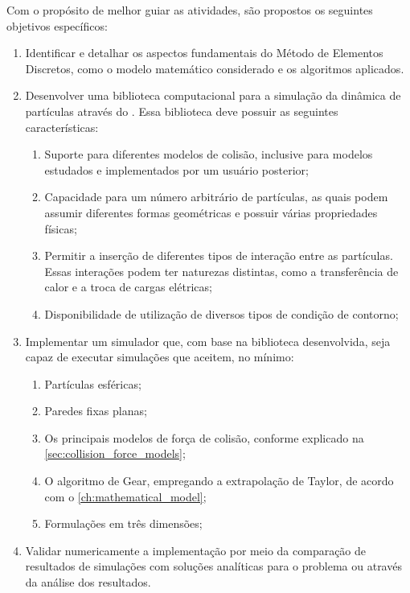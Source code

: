 Com o propósito de melhor guiar as atividades, são propostos os seguintes objetivos específicos:
\begin{enumerate}
\item Identificar e detalhar os aspectos fundamentais do Método de Elementos Discretos, como o modelo matemático considerado e os algoritmos aplicados.
\item Desenvolver uma biblioteca computacional para a simulação da dinâmica de partículas através do \DEM{}. Essa biblioteca deve possuir as seguintes características: \label{item:library}
 	\begin{enumerate}
		\item Suporte para diferentes modelos de colisão, inclusive para modelos estudados e implementados por um usuário posterior;
		\item Capacidade para um número arbitrário de partículas, as quais podem assumir diferentes formas geométricas e possuir várias propriedades físicas;
        \item Permitir a inserção de diferentes tipos de interação entre as partículas. Essas interações podem ter naturezas distintas, como a transferência de calor e a troca de cargas elétricas;
		\item Disponibilidade de utilização de diversos tipos de condição de contorno;
	\end{enumerate}  
\item Implementar um simulador que, com base na biblioteca desenvolvida, seja capaz de executar simulações que aceitem, no mínimo:
	\begin{enumerate}
		\item Partículas esféricas;
		\item Paredes fixas planas;
		\item Os principais modelos de força de colisão, conforme explicado na \cref{sec:collision_force_models};
		\item O algoritmo de Gear, empregando a extrapolação de Taylor, de acordo com o \cref{ch:mathematical_model};
		\item Formulações em três dimensões;
	\end{enumerate}
\item Validar numericamente a implementação por meio da comparação de resultados de simulações com soluções analíticas para o problema ou através da análise dos resultados.
\end{enumerate}

